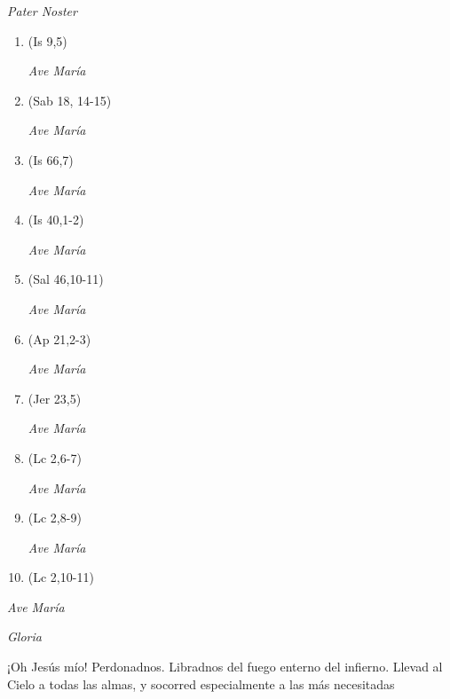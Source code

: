 \documentclass[a4paper,11pt, oneside]{report}
\begin{document}
        \textit{Pater Noster} 

        \begin{enumerate}
          
          \item (Is 9,5)
          
          \textit{Ave María}

          \item (Sab 18, 14-15)
          
          \textit{Ave María}

          \item (Is 66,7)
          
          \textit{Ave María}

          \item (Is 40,1-2)
          
          \textit{Ave María}

          \item (Sal 46,10-11)

          \textit{Ave María}

          \item (Ap 21,2-3)
          
          \textit{Ave María}

          \item (Jer 23,5)

          \textit{Ave María}

          \item (Lc 2,6-7)
          
          \textit{Ave María}

          \item (Lc 2,8-9)
          
          \textit{Ave María}

          \item (Lc 2,10-11)

        \end{enumerate}

        \textit{Ave María} \par
        \indent\textit{Gloria} \par
        \indent¡Oh Jesús mío! Perdonadnos. Libradnos del fuego enterno del infierno. Llevad al Cielo a todas las almas, y socorred especialmente a las más 
        necesitadas
\end{document}
